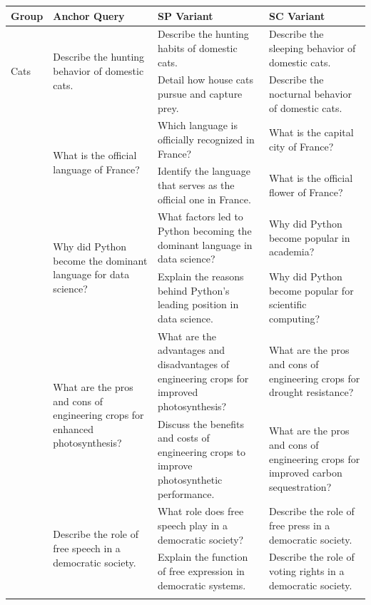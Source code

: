 \begin{table}[!htbp]
\centering
\small
\setlength{\tabcolsep}{4pt}
\begin{tabular}{p{1.75cm} p{2.25cm} p{4.25cm} p{4.25cm}}
\toprule
\textbf{Group} & \textbf{Anchor Query} & \textbf{SP Variant} & \textbf{SC Variant} \\
\midrule
\multirow{2}{*}{Cats} &
\multirow{2}{=}{Describe the hunting behavior of domestic cats.} &
Describe the hunting habits of domestic cats. &
Describe the sleeping behavior of domestic cats. \\
& & Detail how house cats pursue and capture prey. &
Describe the nocturnal behavior of domestic cats. \\
\addlinespace
\multirow{2}{*}{France} &
\multirow{2}{=}{What is the official language of France?} &
Which language is officially recognized in France? &
What is the capital city of France? \\
& & Identify the language that serves as the official one in France. &
What is the official flower of France? \\
\addlinespace
\multirow{2}{*}{Python} &
\multirow{2}{=}{Why did Python become the dominant language for data science?} &
What factors led to Python becoming the dominant language in data science? &
Why did Python become popular in academia? \\
& & Explain the reasons behind Python's leading position in data science. &
Why did Python become popular for scientific computing? \\
\addlinespace
\multirow{2}{*}{Photosynthesis} &
\multirow{2}{=}{What are the pros and cons of engineering crops for enhanced photosynthesis?} &
What are the advantages and disadvantages of engineering crops for improved photosynthesis? &
What are the pros and cons of engineering crops for drought resistance? \\
& & Discuss the benefits and costs of engineering crops to improve photosynthetic performance. &
What are the pros and cons of engineering crops for improved carbon sequestration? \\
\addlinespace
\multirow{2}{*}{Democracy} &
\multirow{2}{=}{Describe the role of free speech in a democratic society.} &
What role does free speech play in a democratic society? &
Describe the role of free press in a democratic society. \\
& & Explain the function of free expression in democratic systems. &
Describe the role of voting rights in a democratic society. \\
\addlinespace

\end{tabular}
\end{table}

